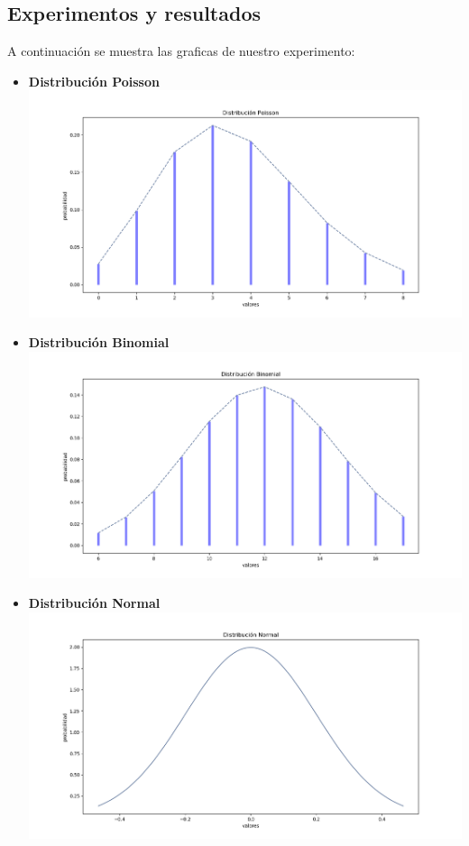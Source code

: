 \documentclass[12pt,a4paper]{article}
\begin{document}
\begin{multicols}{2}
\section{Experimentos y resultados}
    A continuación se muestra las graficas de nuestro experimento:\\
    \begin{itemize}
        \item \textbf{Distribución Poisson}\\
        \includegraphics[scale=0.25]{poisson.png}
        \item \textbf{Distribución Binomial}\\
        \includegraphics[scale=0.25]{binomial.png}
        \item \textbf{Distribución Normal}\\
        \includegraphics[scale=0.25]{normal.png}
    \end{itemize}


\end{multicols}
\end{document}
